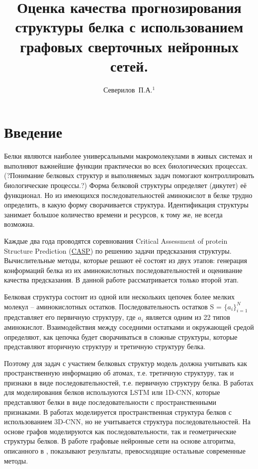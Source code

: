 \documentclass[12pt,twosides]{article}
\title
[Графовые сверточные сети для оценки качества структуры белка]
{Оценка качества прогнозирования структуры белка с использованием графовых сверточных нейронных сетей.}
\author
[Северилов~П.А.] 
{Северилов~П.А.$^1$}
\begin{document}
	\maketitle
	
	\section{Введение}
	
	Белки являются наиболее универсальными макромолекулами в живых системах и выполняют важнейшие функции практически во всех биологических процессах\cite{berg2002biochemistry}. (?Понимание белковых структур и выполняемых задач помогают контроллировать биологические процессы.?)
	Форма белковой структуры определяет (дикутет) её функционал\cite{berg2002biochemistry}. Но из имеющихся последовательностей аминокислот в белке трудно определить, в какую форму сворачивается структура. Идентификация структуры занимает большое количество времени и ресурсов, к тому же, не всегда возможна. 
	
	Каждые два года проводятся соревнования Critical Assessment of protein Structure Prediction (\href{http://predictioncenter.org/}{CASP}) по решению задачи предсказания структуры. 	Вычислительные методы, которые решают её состоят из двух этапов: генерация конформаций белка из их аминокислотных последовательностей и оценивание качества предсказания. В данной работе рассматривается только второй этап.
	
	Белковая структура состоит из одной или нескольких цепочек более мелких молекул -- аминокислотных остатков. Последовательность остатков S = $\{a_i\}_{i=1}^N$ представляет его первичную структуру, где $a_i$ является одним из 22 типов аминокислот. Взаимодействия между соседними остатками и окружающей средой определяют, как цепочка будет сворачиваться в сложные структуры, которые представляют вторичную структуру и третичную структуру белка.
	
	Поэтому для задач с участием белковых структур модель должна учитывать как пространственную информацию об атомах, т.е. третичную структуру, так и признаки в виде последовательностей, т.е. первичную структуру белка.  В работах \cite{HurtadoQA, AngularQA} для моделирования белков используются LSTM или 1D-CNN, которые представляют белки в виде последовательности с пространственными признаками.  В работах \cite{3DCNN, 10.1093/bioinformatics/btz122} моделируется пространственная структура белков с использованием 3D-CNN, но не учитывается структура последовательностей. На основе графов моделируются как последовательности, так и геометрические структуры белков. В работе \cite{Baldassarre2019GraphQAPM} графовые нейронные сети на основе алгоритма, описанного в \cite{Battaglia2018RelationalIB}, показывают результаты, превосходящие остальные современные методы. 
	
\end{document}
